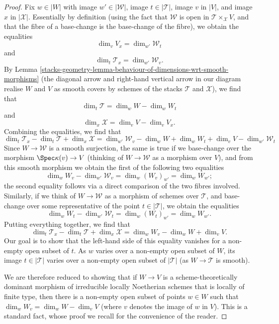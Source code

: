 \begin{proof}
\medskip\noindent
Fix $w \in |W|$ with image $w' \in |\mathcal{W}|$,
image $t \in |\mathcal{T}|$, image $v$ in $|V|$,
and image $x$ in $|\mathcal{X}|$.
Essentially by definition (using the
fact that $\mathcal{W}$ is open in $\mathcal{T}\times_{\mathcal{X}} V$, and that
the fibre of a base-change is the base-change of the fibre),
we obtain the equalities
$$
\dim_v V_x = \dim_{w'} \mathcal{W}_t
$$
and
$$
\dim_t \mathcal{T}_x = \dim_{w'} \mathcal{W}_v.
$$
By Lemma \ref{stacks-geometry-lemma-behaviour-of-dimensions-wrt-smooth-morphisms}
(the diagonal arrow and right-hand vertical
arrow in our diagram realise $W$ and $V$ as smooth covers by
schemes of the stacks $\mathcal{T}$ and $\mathcal{X}$), we find that
$$
\dim_t \mathcal{T} = \dim_w W - \dim_w W_t
$$
and
$$
\dim_x \mathcal{X} = \dim_v V - \dim_v V_x.
$$
Combining the equalities, we find that
$$
\dim_t \mathcal{T}_x - \dim_t \mathcal{T} + \dim_x \mathcal{X}
= \dim_{w'} \mathcal{W}_v - \dim_w W + \dim_w W_t + \dim_v V -
\dim_{w'} \mathcal{W}_t
$$
Since $W \to \mathcal{W}$ is a smooth surjection, the same is true
if we base-change over the morphism $\Spec \kappa(v) \to V$
(thinking of $W \to \mathcal{W}$ as a morphism over $V$),
and from this smooth morphism we obtain the first of the following
two equalities
$$
\dim_w W_v - \dim_{w'} \mathcal{W}_v = \dim_w (W_v)_{w'} = \dim_w W_{w'};
$$
the second equality follows via a direct comparison of the
two fibres involved.
Similarly, if we think of $W \to \mathcal{W}$ as a morphism of schemes
over $\mathcal{T}$, and base-change over some representative of the point
$t \in |\mathcal{T}|$, we obtain the equalities
$$
\dim_w W_t - \dim_{w'} \mathcal{W}_t = \dim_w (W_t)_{w'} = \dim_w W_{w'}.
$$
Putting everything together, we find that
$$
\dim_t \mathcal{T}_x - \dim_t \mathcal{T} + \dim_x \mathcal{X}
=  \dim_w W_v - \dim_w W + \dim_v V.
$$
Our goal is to show that the left-hand side of this equality
vanishes for a non-empty open subset
of $t$.  As $w$ varies over a non-empty open subset of $W$,
its image $t \in |\mathcal{T}|$ varies over a non-empty open
subset of $|\mathcal{T}|$ (as $W \to \mathcal{T}$ is smooth).

\medskip\noindent
We are therefore reduced to showing that if $W\to V$ is a
scheme-theoretically dominant morphism of irreducible locally
Noetherian schemes that is locally of finite type,
then there is a non-empty open subset of
points $w\in W$ such that $\dim_w W_v =\dim_w W - \dim_v V$
(where $v$ denotes the image of $w$ in $V$).
This is a standard fact,
whose proof we recall for the convenience of the reader.


\end{proof}
